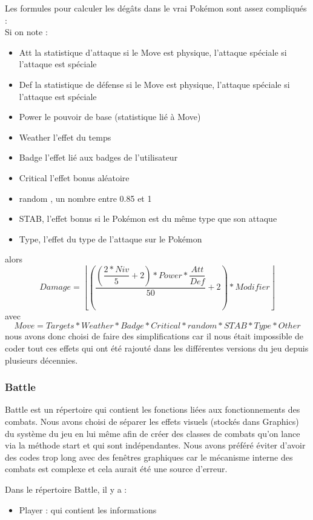 \documentclass[a4paper,twoside, openany,11pt]{book}
\newcommand{\Floor}[1]{\left\lfloor #1 \right\rfloor}
\begin{document}
Les formules pour calculer les dégâts dans le vrai Pokémon sont assez compliqués :\\
Si on note :
\begin{itemize}
\item Att la statistique d'attaque si le Move est physique, l'attaque spéciale si l'attaque est spéciale
\item Def la statistique de défense si le Move est physique, l'attaque spéciale si l'attaque est spéciale
\item Power le pouvoir de base (statistique lié à Move)
\item Weather l'effet du temps
\item Badge l'effet lié aux badges de l'utilisateur
\item Critical l'effet bonus aléatoire 
\item random , un nombre entre 0.85 et 1
\item STAB, l'effet bonus si le Pokémon est du même type que son attaque
\item Type, l'effet du type de l'attaque sur le Pokémon
\end{itemize}
alors 
\[
Damage = \Floor{\left(\dfrac{\left(\dfrac{2 * Niv}{5} + 2\right) * Power * \dfrac{Att}{Def}}{50} + 2 \right) * Modifier}
\]
avec
\[
Move = Targets * Weather * Badge * Critical * random * STAB * Type * Other
\]
nous avons donc choisi de faire des simplifications car il nous était impossible de coder tout ces effets qui ont été rajouté dans les différentes versions du jeu depuis plusieurs décennies.


\subsubsection{Battle}
Battle est un répertoire qui contient les fonctions liées aux fonctionnements des combats. Nous avons choisi de séparer les effets visuels (stockés dans Graphics) du système du jeu en lui même afin de créer des classes de combats qu'on lance via la méthode start et qui sont indépendantes. Nous avons préféré éviter d'avoir des codes trop long avec des fenêtres graphiques car le mécanisme interne des combats est complexe et cela aurait été une source d'erreur.

Dans le répertoire Battle, il y a :
\begin{itemize}
\item Player : qui contient les informations 

\end{itemize}
\end{document}
